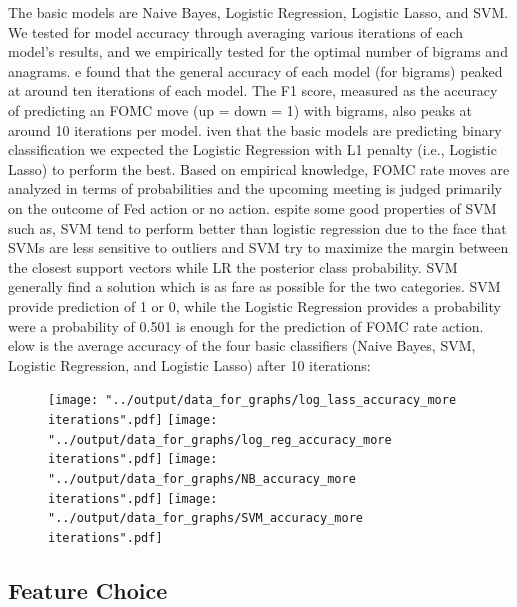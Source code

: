 \documentclass[11pt]{article}
\newcommand{\vertSpace}[1]{\vspace{3mm}}
\begin{document}
The basic models are Naive Bayes, Logistic Regression, Logistic Lasso, and SVM.  We tested for model accuracy through averaging various iterations of each model's results, and we empirically tested for the optimal number of bigrams and anagrams.  \vertSpace


We found that the general accuracy of each model (for bigrams) peaked at around ten iterations of each model.  The F1 score, measured as the accuracy of predicting an FOMC move (up = down = 1) with bigrams, also peaks at around 10 iterations per model. \vertSpace


Given that the basic models are predicting binary classification we expected the Logistic Regression with L1 penalty (i.e., Logistic Lasso) to perform the best.  Based on empirical knowledge, FOMC rate moves are analyzed in terms of probabilities and the upcoming meeting is judged primarily on the outcome of Fed action or no action.  \vertSpace


Despite some good properties of SVM such as, SVM tend to perform better than logistic regression due to the face that SVMs are less sensitive to outliers and SVM try to maximize the margin between the closest support vectors while LR the posterior class probability. SVM generally find a solution which is as fare as possible for the two categories.  SVM provide prediction of 1 or 0, while the Logistic Regression provides a probability were a probability of 0.501 is enough for the prediction of FOMC rate action.  \vertSpace

Below is the average accuracy of the four basic classifiers (Naive Bayes, SVM, Logistic Regression, and Logistic Lasso) after 10 iterations: 

\begin{figure}[H]
\begin{center}
\texttt{[image: "../output/data\_for\_graphs/log\_lass\_accuracy\_more iterations".pdf]}
\texttt{[image: "../output/data\_for\_graphs/log\_reg\_accuracy\_more iterations".pdf]}
\texttt{[image: "../output/data\_for\_graphs/NB\_accuracy\_more iterations".pdf]}
\texttt{[image: "../output/data\_for\_graphs/SVM\_accuracy\_more iterations".pdf]}
\end{center}
\end{figure}




\subsection{Feature Choice}
\end{document}

